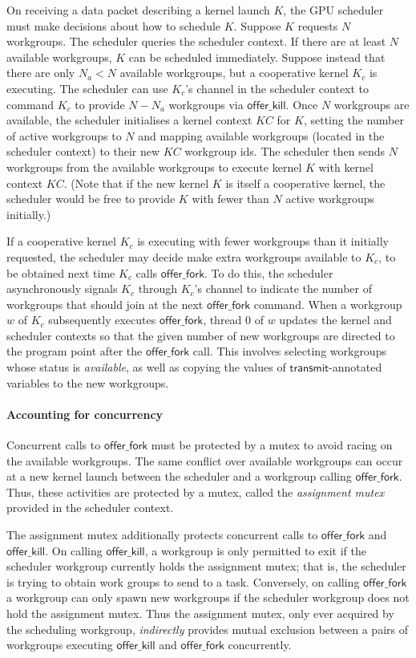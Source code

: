 \documentclass[numbers,nocopyrightspace,10pt]{sigplanconf}
\newcommand{\KC}{\mathit{KC}}
\newcommand{\transmit}{\mathsf{transmit}}
\newcommand{\offerfork}{\mathsf{offer\_fork}}
\newcommand{\offerkill}{\mathsf{offer\_kill}}
\begin{document}
On receiving a data packet
describing a kernel launch $K$, the GPU scheduler must make decisions
about how to schedule $K$. Suppose $K$ requests
$N$ workgroups. The scheduler queries the scheduler context.  If
there are at least $N$ available workgroups, $K$ can be scheduled
immediately. Suppose instead that there are only $N_a < N$ available workgroups, but a cooperative kernel $K_c$ is
executing. The scheduler can use $K_c$'s channel in the scheduler context to command $K_c$ to provide $N - N_a$ workgroups via $\offerkill$.
Once $N$ workgroups are available, the scheduler initialises a
kernel context $\KC$ for $K$, setting the number of active workgroups
to $N$ and mapping available workgroups (located in the scheduler
context) to their new $\KC$ workgroup ids. The scheduler then sends $N$
workgroups from the available workgroups to execute kernel $K$ with
kernel context $\KC$.  (Note that if the new kernel $K$ is itself a cooperative kernel, the scheduler would be free to provide $K$ with fewer than $N$ active workgroups initially.)

If a cooperative kernel $K_c$ is executing with fewer workgroups than it initially requested, the scheduler may decide make extra workgroups available
to $K_c$, to be obtained next time $K_c$ calls $\offerfork$.  To do this, the scheduler asynchronously signals $K_c$ through $K_c$'s
channel to indicate the number of
workgroups that should join at the next $\offerfork$ command.
When a workgroup $w$ of $K_c$ subsequently executes $\offerfork$, thread 0 of $w$ updates the kernel and scheduler contexts so that the given number of new workgroups are directed to the program point after the $\offerfork$ call.  This involves selecting workgroups whose status is \emph{available}, as well as copying the values of $\transmit$-annotated variables to the new workgroups.

\paragraph{Accounting for concurrency}

Concurrent calls to $\offerfork$ must be protected by a mutex to avoid
racing on the available workgroups. The same conflict over available
workgroups can occur at a new kernel launch between the scheduler and
a workgroup calling $\offerfork$. Thus, these activities are protected
by a mutex, called the \emph{assignment mutex} provided in the scheduler
context.

The assignment mutex additionally protects concurrent calls to
$\offerfork$ and $\offerkill$.  On calling $\offerkill$, a workgroup
is only permitted to exit if the scheduler workgroup currently holds
the assignment mutex; that is, the scheduler is trying to obtain work
groups to send to a task.  Conversely, on calling $\offerfork$ a
workgroup can only spawn new workgroups if the scheduler workgroup
does not hold the assignment mutex.  Thus the assignment mutex, only
ever acquired by the scheduling workgroup, \emph{indirectly} provides
mutual exclusion between a pairs of workgroups executing $\offerkill$
and $\offerfork$ concurrently.
\end{document}
